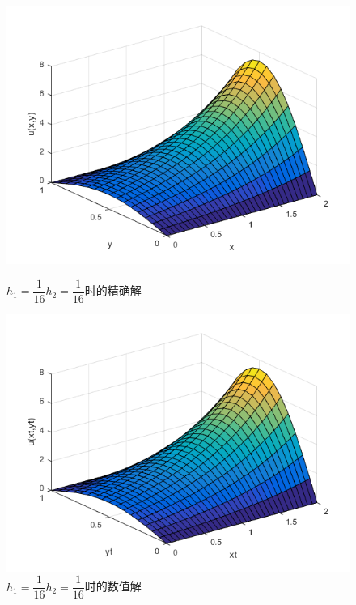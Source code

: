 \documentclass[withoutpreface,bwprint]{cumcmthesis} %
\begin{document}
\begin{figure}[htbp]
	\begin{minipage}[htbp]{0.5\linewidth}
		\centering
		\includegraphics[width=1\linewidth]{figures/f1}
		\caption{$h_1=\dfrac{1}{16}$\quad$h_2=\dfrac{1}{16}$时的精确解}
		\label{fig:f1}
	\end{minipage}
	\begin{minipage}[htbp]{0.5\linewidth}
	\centering
	\includegraphics[width=1\linewidth]{figures/f2}
	\caption{$h_1=\dfrac{1}{16}$\quad$h_2=\dfrac{1}{16}$时的数值解}
	\label{fig:f2}
	\end{minipage}
\end{figure}
\end{document}
